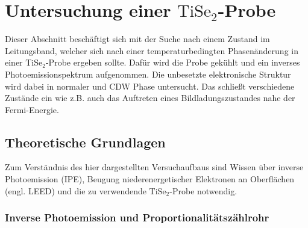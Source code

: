\clearpage
\section{\texorpdfstring{Untersuchung einer $\text{TiSe}_2$-Probe}{Untersuchung einer TiSe2-Probe}}
\label{sec:thijs2}

Dieser Abschnitt beschäftigt sich mit der Suche nach einem Zustand im Leitungsband, welcher sich nach einer temperaturbedingten Phasenänderung in einer $\text{TiSe}_2$-Probe ergeben sollte.
Dafür wird die Probe gekühlt und ein inverses Photoemissionspektrum aufgenommen.
Die unbesetzte elektronische Struktur wird dabei in normaler und CDW Phase untersucht. %
Das schließt verschiedene Zustände ein wie z.B. auch das Auftreten eines Bildladungszustandes nahe der Fermi-Energie.

\subsection{Theoretische Grundlagen}
\label{sec:theo1}

Zum Verständnis des hier dargestellten Versuchaufbaus sind Wissen über inverse Photoemission (IPE), Beugung niederenergetischer Elektronen an Oberflächen (engl. LEED) und die zu verwendende $\text{TiSe}_2$-Probe notwendig.

\subsubsection{Inverse Photoemission und Proportionalitätszählrohr}

